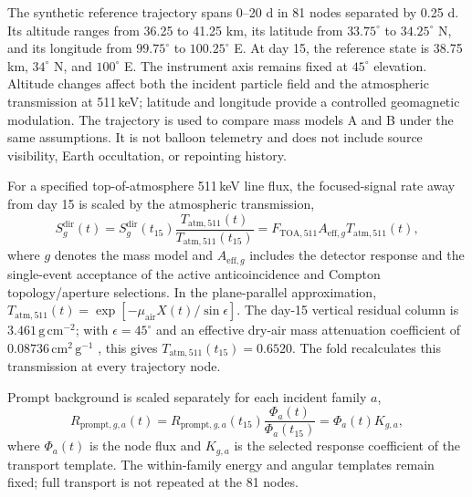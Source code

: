 \documentclass[11pt]{article}
\begin{document}
The synthetic reference trajectory spans 0--20 d in 81 nodes separated by
0.25 d. Its altitude ranges from 36.25 to 41.25 km, its latitude from
$33.75^\circ$ to $34.25^\circ$ N, and its longitude from $99.75^\circ$ to
$100.25^\circ$ E. At day 15, the reference state is 38.75 km,
$34^\circ$ N, and $100^\circ$ E. The instrument axis remains fixed at
$45^\circ$ elevation. Altitude changes affect both the incident
particle field and the atmospheric transmission at 511\,keV; latitude and
longitude provide a controlled geomagnetic modulation. The trajectory is used
to compare mass models A and B under the same assumptions. It is not balloon
telemetry and does not include source visibility, Earth occultation, or
repointing history.

For a specified top-of-atmosphere 511\,keV line flux, the focused-signal rate
away from day 15 is scaled by the atmospheric transmission,
\begin{equation}
 S^{\mathrm{dir}}_g(t)
 =S^{\mathrm{dir}}_g(t_{15})
 \frac{T_{\mathrm{atm},511}(t)}{T_{\mathrm{atm},511}(t_{15})}
 =F_{\mathrm{TOA},511}A_{\mathrm{eff},g}T_{\mathrm{atm},511}(t),
 \label{eq:mission_signal}
\end{equation}
where $g$ denotes the mass model and $A_{\mathrm{eff},g}$ includes the detector
response and the single-event acceptance of the active anticoincidence and
Compton topology/aperture selections. In the plane-parallel approximation,
$T_{\mathrm{atm},511}(t)=\exp[-\mu_{\mathrm{air}}X(t)/\sin\epsilon]$. The
day-15 vertical residual column is $3.461\,\mathrm{g\,cm^{-2}}$; with
$\epsilon=45^\circ$ and an effective dry-air mass attenuation coefficient of
$0.08736\,\mathrm{cm^2\,g^{-1}}$ \cite{NISTXCOM}, this gives
$T_{\mathrm{atm},511}(t_{15})=0.6520$. The fold recalculates this transmission
at every trajectory node.

Prompt background is scaled separately for each incident family $a$,
\begin{equation}
 R_{\mathrm{prompt},g,a}(t)
 =R_{\mathrm{prompt},g,a}(t_{15})
 \frac{\Phi_a(t)}{\Phi_a(t_{15})}
 =\Phi_a(t)K_{g,a},
 \label{eq:prompt_source_response}
\end{equation}
where $\Phi_a(t)$ is the node flux and $K_{g,a}$ is the selected response
coefficient of the transport template. The within-family energy and angular
templates remain fixed; full transport is not repeated at the 81 nodes.
\end{document}

